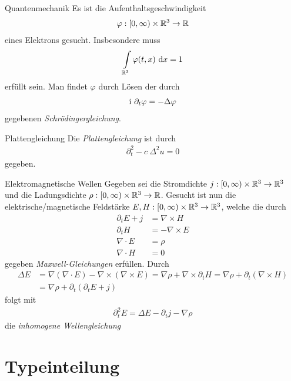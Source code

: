\begin{genericdf}{Quantenmechanik}
Es ist die Aufenthaltsgeschwindigkeit
\begin{align*}
\varphi : [0, \infty) \times \mathbb{R}^3 \to \mathbb{R}
\end{align*}
eines Elektrons gesucht.
Insbesondere muss
\begin{align*}
\int \limits_{\mathbb{R}^3} \varphi(t,x) \ \text{\rmfamily d} x= 1
\end{align*}
erfüllt sein.
Man findet $\varphi$ durch Lösen der durch
\begin{align*}
\textrm{i} \  \partial_t \varphi  = - \Delta \varphi
\end{align*}
gegebenen \textit{Schrödingergleichung}.
\end{genericdf}

\begin{genericdf}{Plattengleichung}
Die \textit{Plattengleichung} ist durch
\begin{align*}
\partial_t^2 - c \ \Delta^2 u = 0
\end{align*}
gegeben.
\end{genericdf}

\begin{genericdf}{Elektromagnetische Wellen}
Gegeben sei die Stromdichte 
$j : [0, \infty) \times \mathbb{R}^3 \to \mathbb{R}^3$
und die Ladungsdichte
$\rho : [0,\infty) \times \mathbb{R}^3 \to \mathbb{R}$.
Gesucht ist nun die elektrische/magnetische Feldstärke $E,H : [0, \infty)\times \mathbb{R}^3 \to \mathbb{R}^3$, 
welche die durch
\begin{align*}
\partial_t E + j &= \nabla \times H\\
\partial_t H 	&= - \nabla \times E\\
\nabla \cdot E &= \rho\\
\nabla \cdot H &= 0
\end{align*}
gegeben \textit{Maxwell-Gleichungen} erfüllen.
Durch 
\begin{align*}
\Delta E &= \nabla( \nabla \cdot E ) - \nabla \times ( \nabla \times E) 
= \nabla \rho + \nabla \times \partial_t H 
= \nabla \rho + \partial_t(\nabla \times  H)\\
&= \nabla \rho + \partial_t(\partial_t E + j) 
\end{align*}
folgt mit
\begin{align*}
\partial^2_t E = \Delta E - \partial_t j - \nabla \rho
\end{align*}
die \textit{inhomogene Wellengleichung}
\end{genericdf}

\newpage
\section{Typeinteilung}

